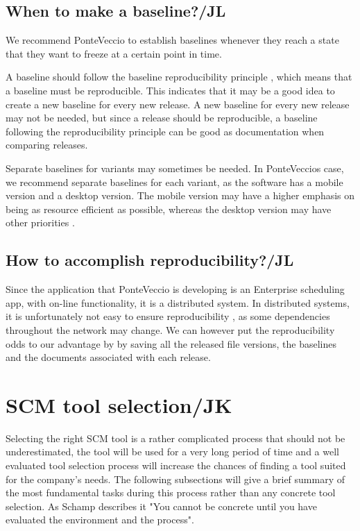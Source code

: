 \documentclass[10pt]{article}
\begin{document}
\subsection{When to make a baseline?/JL}
We recommend PonteVeccio to establish baselines whenever they reach a state that they want to freeze at a certain point in time.  

\noindent A baseline should follow the baseline reproducibility principle \cite{Appleton2}, which means that a baseline must be reproducible. This indicates that it may be a good idea to create a new baseline for every new release. A new baseline for every new release may not be needed, but since a release should be reproducible, a baseline following the reproducibility principle can be good as documentation when comparing releases.

\noindent Separate baselines for variants may sometimes be needed. In PonteVeccios case, we recommend separate baselines for each variant, as the software has a mobile version and a desktop version. The mobile version may have a higher emphasis on being as resource efficient as possible, whereas the desktop version may have other priorities \cite{Nielsen}.

\subsection{How to accomplish reproducibility?/JL}
\noindent Since the application that PonteVeccio is developing is an Enterprise scheduling app, with on-line functionality, it is a distributed system. In distributed systems, it is unfortunately not easy to ensure reproducibility \cite{Bays}, as some dependencies throughout the network may change. We can however put the reproducibility odds to our advantage by by saving all the released file versions, the baselines and the documents associated with each release. 

\section{SCM tool selection/JK}
Selecting the right SCM tool is a rather complicated process that should not be underestimated, the tool will be used for a very long period of time and a well evaluated tool selection process will increase the chances of finding a tool suited for the company's needs. The following subsections will give a brief summary of the most fundamental tasks during this process rather than any concrete tool selection. As Schamp \cite{Schamp} describes it
"You cannot be concrete until you have evaluated the environment and the process".
\end{document}
